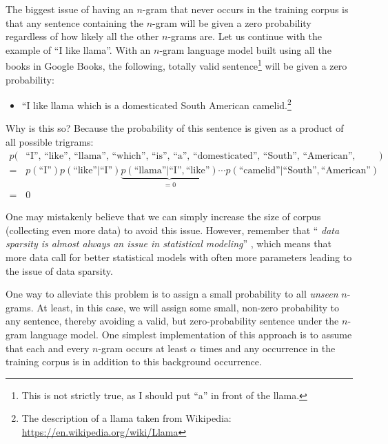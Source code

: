 \documentclass{report}
\begin{document}
The biggest issue of having an $n$-gram that never occurs in the training corpus
is that any sentence containing the $n$-gram will be given a zero probability
regardless of how likely all the other $n$-grams are. Let us continue with the
example of ``I like llama''. With an $n$-gram language model built using all the
books in Google Books, the following, totally valid sentence\footnote{
    This is not strictly true, as I should put ``a'' in front of the llama.
}
will be given a
zero probability:
\begin{itemize}
    \itemsep 0em
    \item ``I like llama which is a domesticated South American
        camelid.\footnote{
            The description of a llama taken from Wikipedia:
            \url{https://en.wikipedia.org/wiki/Llama}
        }
\end{itemize}
Why is this so? Because the probability of this sentence is given as a product
of all possible trigrams:
\begin{align*}
    p(&\text{``I'', ``like'', ``llama'', ``which'', ``is'', ``a'',
        ``domesticated'', ``South'',
    ``American'', ``camelid''}) \\
    =& p(\text{``I''}) p(\text{``like''}|\text{``I''})
    \underbrace{p(\text{``llama''}|\text{``I''}, \text{``like''})}_{=0} \cdots
    p(\text{``camelid''}|\text{``South''}, \text{``American''}) \\
    =& 0
\end{align*}

One may mistakenly believe that we can simply increase the size of corpus
(collecting even more data) to avoid this issue. However, remember that ``{\it
data sparsity is almost always an issue in statistical modeling}''
\cite{chen1996empirical}, which means that more data call for better statistical
models with often more parameters leading to the issue of data sparsity.

One way to alleviate this problem is to assign a small probability to all {\em
unseen} $n$-grams. At least, in this case, we will assign some small, non-zero
probability to any sentence, thereby avoiding a valid, but zero-probability
sentence under the $n$-gram language model. One simplest implementation of this
approach is to assume that each and every $n$-gram occurs at least $\alpha$
times and any occurrence in the training corpus is in addition to this
background occurrence. 
\end{document}
